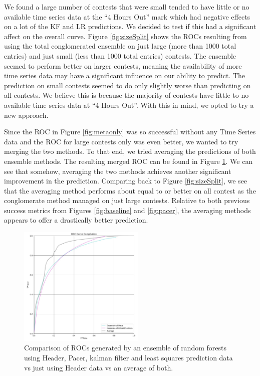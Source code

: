 We found a large number of contests that were small tended to have little or no available time series data at the ``4 Hours Out'' mark which had negative effects on a lot of the KF and LR predictions. We decided to test if this had a significant affect on the overall curve. Figure \ref{fig:sizeSplit} shows the ROCs resulting from using the total conglomerated ensemble on just large (more than 1000 total  entries) and just small (less than 1000 total entries) contests. The ensemble seemed to perform better on larger contests, meaning the availability of more time series data may have a significant influence on our ability to predict. The prediction on small contests seemed to do only slightly worse than predicting on all contests. We believe this is because the majority of contests have little to no available time series data at ``4 Hours Out''. With this in mind, we opted to try a new approach.

Since the ROC in Figure \ref{fig:metaonly} was so successful without any Time Series data and the ROC for large contests only was even better, we wanted to try merging the two methods. To that end, we tried averaging the predictions of both ensemble methods. The resulting merged ROC can be found in Figure \ref{fig:averaged}. We can see that somehow, averaging the two methods achieves another significant improvement in the prediction. Comparing back to Figure \ref{fig:sizeSplit}, we see that the averaging method performs about equal to or better on all contest as the conglomerate method managed on just large contests. Relative to both previous success metrics from Figures \ref{fig:baseline} and \ref{fig:pacer}, the averaging methods appears to offer a drastically better prediction.

\begin{figure}[h]
\centering
\includegraphics[width=6cm]{body/results/melded.jpeg}
\caption{Comparison of ROCs generated by an ensemble of random forests using Header, Pacer, kalman filter and least squares prediction data vs just using Header data vs an average of both.}
\label{fig:averaged}
\end{figure}

